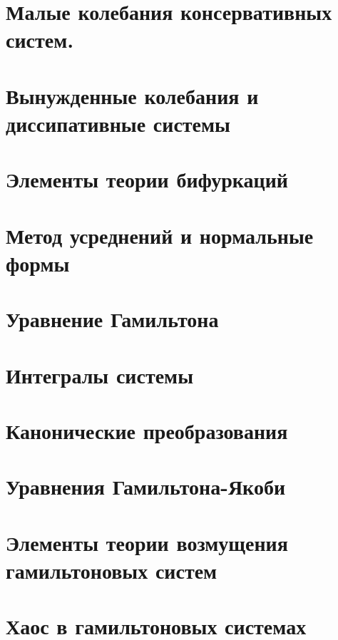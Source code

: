 


\section{Малые колебания консервативных систем.}


\section{Вынужденные колебания и диссипативные системы}


\section{Элементы теории бифуркаций}


\section{Метод усреднений и нормальные формы}


\section{Уравнение Гамильтона}


\section{Интегралы системы}


\section{Канонические преобразования}


\section{Уравнения Гамильтона-Якоби}


% 

\section{Элементы теории возмущения гамильтоновых систем}


\section{Хаос в гамильтоновых системах}





   
 



